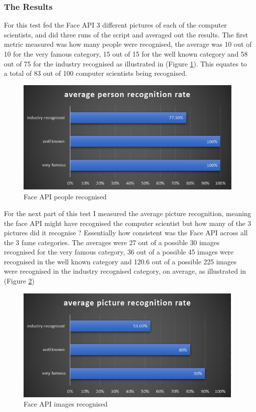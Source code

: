 \documentclass[12pt,a4paper]{article}
\begin{document}
\subsubsection{The Results}

For this test fed the Face API 3 different pictures of each of the computer scientists, and did three runs of the script and averaged out the results. The first metric measured was how many people were recognised, the average was 10 out of 10 for the very famous category, 15 out of 15 for the well known category and 58 out of 75 for the industry recognised as illustrated in (Figure \ref{fer1}). This equates to a total of 83 out of 100 computer scientists being recognised. 

\begin{figure}[h]
    \centering
    \includegraphics[width=1.0\textwidth]{Figs/faceevalr1.PNG} 
    \caption{Face API people recognised} 
    \label{fer1}
\end{figure}

For the next part of this test I measured the average picture recognition, meaning the face API might have recognised the computer scientist but how many of the 3 pictures did it recognise ? Essentially how consistent was the Face API across all the 3 fame categories. The averages were 27 out of a possible 30 images recognised for the very famous category, 36 out of a possible 45 images were recognised in the well known category and 120.6 out of a possible 225 images were recognised in the industry recognised category, on average, as illustrated in (Figure \ref{fer2})  

\begin{figure}[h]
    \centering
    \includegraphics[width=1.0\textwidth]{Figs/faceevalr2.PNG} 
    \caption{Face API images recognised} 
    \label{fer2}
\end{figure}
\end{document}

